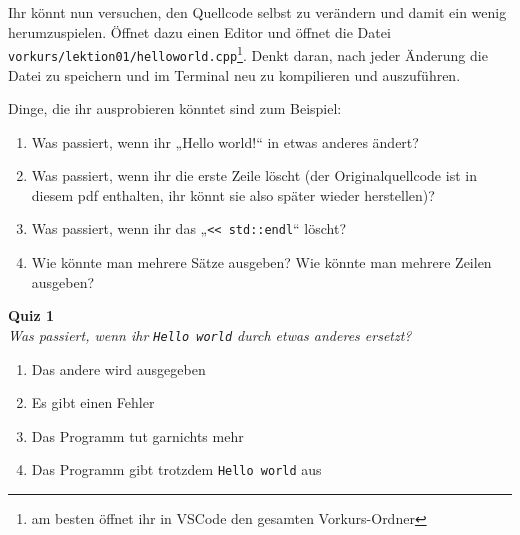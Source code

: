 \newpage

\begin{spiel}

Ihr könnt nun versuchen, den Quellcode selbst zu verändern und damit ein wenig
herumzuspielen. Öffnet dazu einen Editor und öffnet die Datei
\texttt{vorkurs/lektion01/helloworld.cpp}\footnote{am besten öffnet ihr in VSCode den gesamten Vorkurs-Ordner}. Denkt daran, nach jeder Änderung die Datei zu speichern und
im Terminal neu zu kompilieren und auszuführen.

Dinge, die ihr ausprobieren könntet sind zum Beispiel:
\begin{enumerate}
    \item Was passiert, wenn ihr „Hello world!“ in etwas anderes ändert?
    \item Was passiert, wenn ihr die erste Zeile löscht (der Originalquellcode
        ist in diesem pdf enthalten, ihr könnt sie also später wieder
        herstellen)?
    \item Was passiert, wenn ihr das „\verb|<< std::endl|“ löscht?
    \item Wie könnte man mehrere Sätze ausgeben? Wie könnte man mehrere Zeilen
        ausgeben?
\end{enumerate}
\end{spiel}

\textbf{Quiz 1}\\
\textit{Was passiert, wenn ihr \texttt{Hello world} durch etwas anderes ersetzt?}
\begin{enumerate}[label=\alph*)]
    \item Das andere wird ausgegeben
    \item Es gibt einen Fehler
    \item Das Programm tut garnichts mehr
    \item Das Programm gibt trotzdem \texttt{Hello world} aus
\end{enumerate}